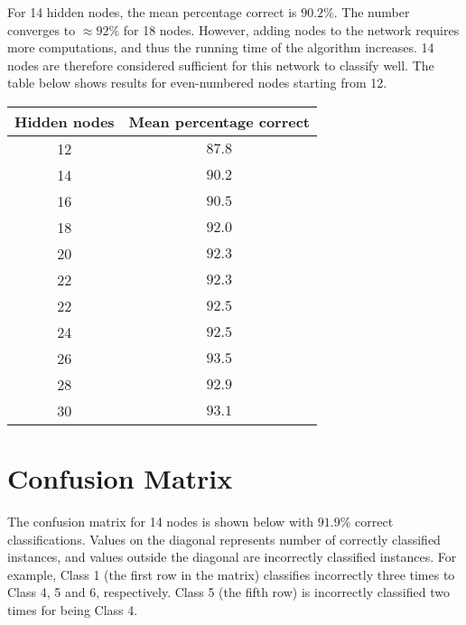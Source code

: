 \documentclass{article}
\begin{document}

\noindent For 14 hidden nodes, the mean percentage correct is $90.2\%$. The number converges to $\approx 92\%$ for 18 nodes. However, adding nodes to the network requires more computations, and thus the running time of the algorithm increases. 14 nodes are therefore considered sufficient for this network to classify well. The table below shows results for even-numbered nodes starting from 12.

\begin{center}
\begin{tabular}{cc}
\toprule
Hidden nodes & Mean percentage correct \\
\midrule
12 & $87.8$\\
14 & $90.2$\\
16 & $90.5$\\
18 & $92.0$\\
20 & $92.3$\\
22 & $92.3$\\
22 & $92.5$\\
24 & $92.5$\\
26 & $93.5$\\
28 & $92.9$\\
30 & $93.1$\\
\bottomrule
\end{tabular}
\end{center}

\section*{Confusion Matrix}

\noindent The confusion matrix for 14 nodes is shown below with $91.9\%$ correct classifications. Values on the diagonal represents number of correctly classified instances, and values outside the diagonal are incorrectly classified instances. For example, Class 1 (the first row in the matrix) classifies incorrectly three times to Class 4, 5 and 6, respectively. Class 5 (the fifth row) is incorrectly classified two times for being Class 4.
\end{document}
